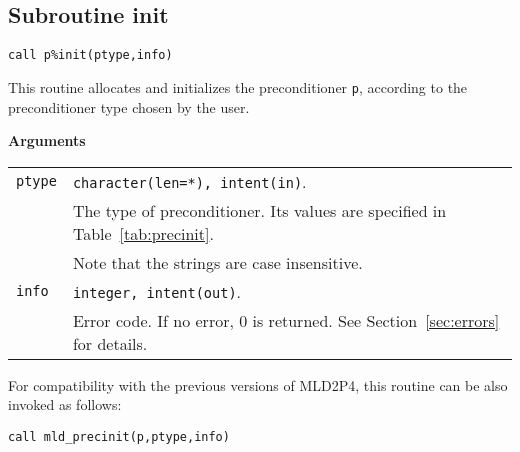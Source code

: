 \subsection{Subroutine init\label{sec:precinit}}

\begin{center}
\verb|call p%init(ptype,info)|
\end{center}

\noindent
This routine allocates and initializes the preconditioner
\verb|p|, according to the preconditioner type chosen by the user.

{\baselineskip\noindent\large\bfseries Arguments} \smallskip

\begin{tabular}{p{1.2cm}p{12cm}}
\verb|ptype|  & \verb|character(len=*), intent(in)|.\\
              & The type of preconditioner. Its values are specified
              in Table~\ref{tab:precinit}.\\
              & Note that the strings are case insensitive.\\
\verb|info|   & \verb|integer, intent(out)|.\\
              & Error code. If no error, 0 is returned. See Section~\ref{sec:errors} for details.\\
\end{tabular}

\baselineskip
For compatibility with the previous versions of MLD2P4, this routine can be also invoked
as follows:

\begin{center}
\verb|call mld_precinit(p,ptype,info)|
\end{center}


